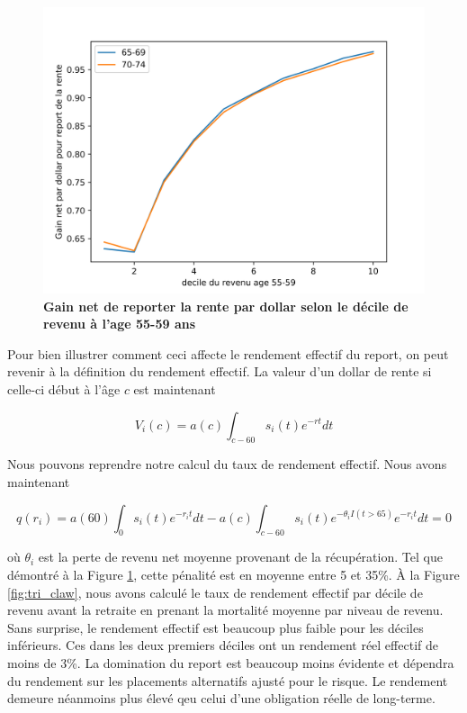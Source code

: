 \documentclass[french, 12pt]{article}
\begin{document}
	
	\begin{figure}[!htbp]
	\centering 
	\includegraphics[scale=0.75]{../figures/claw_decile.png}
	\caption{\textbf{Gain net de reporter la rente par dollar selon le décile de revenu à l'age 55-59 ans}}
	\label{fig:claw}
	\end{figure}
	
	Pour bien illustrer comment ceci affecte le rendement effectif du report, on peut revenir à la définition du rendement effectif. La valeur d'un dollar de rente si celle-ci début à l'âge $c$ est maintenant 
	
	$$ V_i(c) = a(c)\int_{c-60} s_{i}(t)e^{-rt}dt$$
		
	Nous pouvons reprendre notre calcul du taux de rendement effectif. Nous avons maintenant 
	
	$$ q(r_i) = a(60)\int_0 s_{i}(t)e^{-r_i t}dt - a(c)\int_{c-60} s_{i}(t)e^{-\theta_iI(t>65)}e^{-r_i t}dt = 0$$
	
	où $\theta_i$ est la perte de revenu net moyenne provenant de la récupération. Tel que démontré à la Figure \ref{fig:claw}, cette pénalité est en moyenne entre 5 et 35\%. À la Figure \ref{fig:tri_claw}, nous avons calculé le taux de rendement effectif par décile de revenu avant la retraite en prenant la mortalité moyenne par niveau de revenu. Sans surprise, le rendement effectif est beaucoup plus faible pour les déciles inférieurs. Ces dans les deux premiers déciles ont un rendement réel effectif de moins de 3\%. La domination du report est beaucoup moins évidente et dépendra du rendement sur les placements alternatifs ajusté pour le risque. Le rendement demeure néanmoins plus élevé qeu celui d'une obligation réelle de long-terme. 
	
\end{document}
